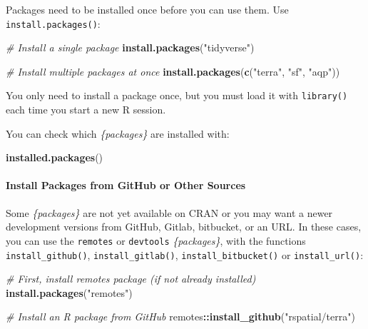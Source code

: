 \documentclass[
  10pt,
  b5paper,
  oneside]{book}
\newenvironment{Shaded}{\begin{snugshade}}{\end{snugshade}}
\newcommand{\CommentTok}[1]{\textcolor[rgb]{0.56,0.35,0.01}{\textit{#1}}}
\newcommand{\FunctionTok}[1]{\textcolor[rgb]{0.13,0.29,0.53}{\textbf{#1}}}
\newcommand{\NormalTok}[1]{#1}
\newcommand{\SpecialCharTok}[1]{\textcolor[rgb]{0.81,0.36,0.00}{\textbf{#1}}}
\newcommand{\StringTok}[1]{\textcolor[rgb]{0.31,0.60,0.02}{#1}}
\begin{document}
Packages need to be installed once before you can use them.
Use \texttt{install.packages()}:

\begin{Shaded}
\begin{Highlighting}[]
\CommentTok{\# Install a single package}
\FunctionTok{install.packages}\NormalTok{(}\StringTok{"tidyverse"}\NormalTok{)}

\CommentTok{\# Install multiple packages at once}
\FunctionTok{install.packages}\NormalTok{(}\FunctionTok{c}\NormalTok{(}\StringTok{"terra"}\NormalTok{, }\StringTok{"sf"}\NormalTok{, }\StringTok{"aqp"}\NormalTok{))}
\end{Highlighting}
\end{Shaded}

You only need to install a package once, but you must load it with \texttt{library()} each time you start a new R session.

You can check which \emph{\{packages\}} are installed with:

\begin{Shaded}
\begin{Highlighting}[]
\FunctionTok{installed.packages}\NormalTok{()}
\end{Highlighting}
\end{Shaded}

\paragraph*{Install Packages from GitHub or Other Sources}\label{install-packages-from-github-or-other-sources}

Some \emph{\{packages\}} are not yet available on CRAN or you may want a newer development versions from GitHub, Gitlab, bitbucket, or an URL.
In these cases, you can use the \texttt{remotes} or \texttt{devtools} \emph{\{packages\}}, with the functions \texttt{install\_github()}, \texttt{install\_gitlab()}, \texttt{install\_bitbucket()} or \texttt{install\_url()}:

\begin{Shaded}
\begin{Highlighting}[]
\CommentTok{\# First, install remotes package (if not already installed)}
\FunctionTok{install.packages}\NormalTok{(}\StringTok{"remotes"}\NormalTok{)}

\CommentTok{\# Install an R package from GitHub}
\NormalTok{remotes}\SpecialCharTok{::}\FunctionTok{install\_github}\NormalTok{(}\StringTok{"rspatial/terra"}\NormalTok{)}
\end{Highlighting}
\end{Shaded}
\end{document}
